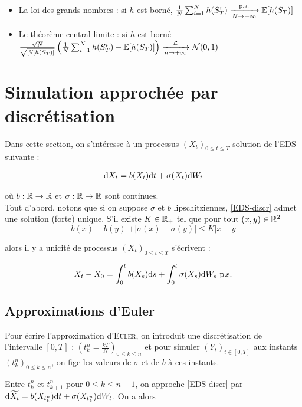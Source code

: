 \begin{itemize}
  \item La loi des grands nombres : si $h$ est borné, $ \frac{1}{N} \sum_{i=1}^{N} h(S_T^i) \xrightarrow[N\to +\infty]{\text{p.s.}} \mathbb{E}[h(S_T)]$
  \item Le théorème central limite : si $h$ est borné $ \frac{\sqrt{N}}{\sqrt{[\mathbb{V}[h(S_T)]}}\left( \frac{1}{N} \sum_{i=1}^{N} h(S_T^i) - \mathbb{E}[h(S_T)] \right) \xrightarrow[n\to +\infty]{\mathcal{L}} \mathcal{N}(0,1)$
\end{itemize}

\section{Simulation approchée par discrétisation}
Dans cette section, on s'intéresse à un processus $(X_t)_{0 \leq t \leq T}$ solution de l'EDS suivante :

\begin{equation}
  \label{EDS-discr}
\begin{split}
\mathrm{d} X_t = b(X_t) \mathrm{d} t + \sigma(X_t) \mathrm{d} W_t 
\end{split}
\end{equation}

où $b : \mathbb{R} \to \mathbb{R}$ et $\sigma : \mathbb{R} \to \mathbb{R}$ sont continues. \\

Tout d'abord, notons que si on suppose $\sigma$ et $b$ lipschitziennes, \eqref{EDS-discr} admet une solution (forte) unique. S'il existe $K \in \mathbb{R}_+$ tel que pour tout $(x,y) \in \mathbb{R}^2$
\[ \vert b(x) - b(y) \vert + \vert \sigma(x) - \sigma(y) \vert \leq K \vert x - y \vert \]

alors il y a unicité de processus $(X_t)_{0 \leq t \leq T}$ s'écrivent :

\[ X_t - X_0 = \int_{0}^{t} b(X_s) \mathrm{d} s + \int_{0}^{t} \sigma(X_s) \mathrm{d} W_s \text{ p.s.} \]

\subsection{Approximations d'Euler}

Pour écrire l'approximation d'\textsc{Euler}, on introduit une discrétisation de l'intervalle $[0,T]$ : $\left( t_k^n = \frac{kT}{N} \right)_{0 \leq k \leq n}$ et pour simuler $(Y_t)_{t \in [0,T]}$ aux instants $(t_k^n)_{0 \leq k \leq n}$, on \og fige \fg{} les valeurs de $\sigma$ et de $b$ à ces instants.

Entre $t_k^n$ et $t_{k+1}^n$ pour $0 \leq k \leq n-1$, on approche \eqref{EDS-discr} par $\mathrm{d} \widetilde{X_t} = b(X_{t_k^n}) \mathrm{d} t + \sigma(X_{t_k^n}) \mathrm{d} W_t$. On a alors 

